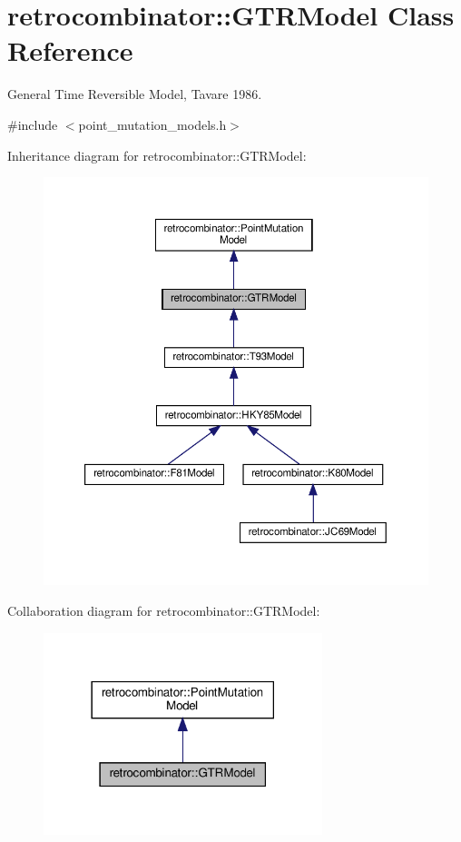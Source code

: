 \hypertarget{classretrocombinator_1_1GTRModel}{}\section{retrocombinator\+:\+:G\+T\+R\+Model Class Reference}
\label{classretrocombinator_1_1GTRModel}


General Time Reversible Model, Tavare 1986.  




{\ttfamily \#include $<$point\+\_\+mutation\+\_\+models.\+h$>$}



Inheritance diagram for retrocombinator\+:\+:G\+T\+R\+Model\+:
\nopagebreak
\begin{figure}[H]
\begin{center}
\leavevmode
\includegraphics[width=350pt]{classretrocombinator_1_1GTRModel__inherit__graph}
\end{center}
\end{figure}


Collaboration diagram for retrocombinator\+:\+:G\+T\+R\+Model\+:
\nopagebreak
\begin{figure}[H]
\begin{center}
\leavevmode
\includegraphics[width=230pt]{classretrocombinator_1_1GTRModel__coll__graph}
\end{center}
\end{figure}
